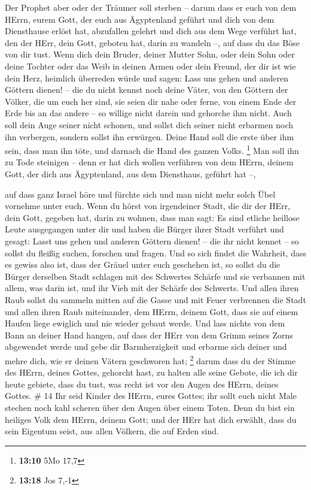  Der Prophet aber oder der Träumer soll sterben -- darum
dass er euch von dem HErrn, eurem Gott, der euch aus Ägyptenland geführt
und dich von dem Diensthause erlöst hat, abzufallen gelehrt und dich aus
dem Wege verführt hat, den der HErr, dein Gott, geboten hat, darin zu
wandeln --, auf dass du das Böse von dir tust.  Wenn dich
dein Bruder, deiner Mutter Sohn, oder dein Sohn oder deine Tochter oder
das Weib in deinen Armen oder dein Freund, der dir ist wie dein Herz,
heimlich überreden würde und sagen: Lass uns gehen und anderen Göttern
dienen! -- die du nicht kennst noch deine Väter,  von den
Göttern der Völker, die um euch her sind, sie seien dir nahe oder ferne,
von einem Ende der Erde bis an das andere --  so willige
nicht darein und gehorche ihm nicht. Auch soll dein Auge seiner nicht
schonen, und sollst dich seiner nicht erbarmen noch ihn verbergen,
 sondern sollst ihn erwürgen. Deine Hand soll die erste
über ihm sein, dass man ihn töte, und darnach die Hand des ganzen Volks.
\footnote{\textbf{13:10} 5Mo 17,7}  Man soll ihn zu Tode
steinigen -- denn er hat dich wollen verführen von dem HErrn, deinem
Gott, der dich aus Ägyptenland, aus dem Diensthaus, geführt hat --,

 auf dass ganz Israel höre und fürchte sich und man nicht
mehr solch Übel vornehme unter euch.  Wenn du hörst von
irgendeiner Stadt, die dir der HErr, dein Gott, gegeben hat, darin zu
wohnen, dass man sagt:  Es sind etliche heillose Leute
ausgegangen unter dir und haben die Bürger ihrer Stadt verführt und
gesagt: Lasst uns gehen und anderen Göttern dienen! -- die ihr nicht
kennet --  so sollst du fleißig suchen, forschen und
fragen. Und so sich findet die Wahrheit, dass es gewiss also ist, dass
der Gräuel unter euch geschehen ist,  so sollst du die
Bürger derselben Stadt schlagen mit des Schwertes Schärfe und sie
verbannen mit allem, was darin ist, und ihr Vieh mit der Schärfe des
Schwerts.  Und allen ihren Raub sollst du sammeln mitten
auf die Gasse und mit Feuer verbrennen die Stadt und allen ihren Raub
miteinander, dem HErrn, deinem Gott, dass sie auf einem Haufen liege
ewiglich und nie wieder gebaut werde.  Und lass nichts von
dem Bann an deiner Hand hangen, auf dass der HErr von dem Grimm seines
Zorns abgewendet werde und gebe dir Barmherzigkeit und erbarme sich
deiner und mehre dich, wie er deinen Vätern geschworen hat; \footnote{\textbf{13:18}
  Jos 7,-1}  darum dass du der Stimme des HErrn, deines
Gottes, gehorcht hast, zu halten alle seine Gebote, die ich dir heute
gebiete, dass du tust, was recht ist vor den Augen des HErrn, deines
Gottes. \# 14  Ihr seid Kinder des HErrn, eures Gottes; ihr
sollt euch nicht Male stechen noch kahl scheren über den Augen über
einem Toten.  Denn du bist ein heiliges Volk dem HErrn,
deinem Gott; und der HErr hat dich erwählt, dass du sein Eigentum seist,
aus allen Völkern, die auf Erden sind.

